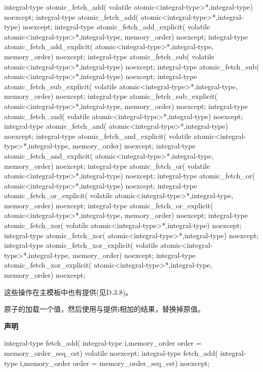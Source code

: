\begin{cpp}
integral-type atomic_fetch_add(
    volatile atomic<integral-type>*,integral-type) noexcept;
integral-type atomic_fetch_add(
    atomic<integral-type>*,integral-type) noexcept;
integral-type atomic_fetch_add_explicit(
    volatile atomic<integral-type>*,integral-type, memory_order) noexcept;
integral-type atomic_fetch_add_explicit(
    atomic<integral-type>*,integral-type, memory_order) noexcept;
integral-type atomic_fetch_sub(
    volatile atomic<integral-type>*,integral-type) noexcept;
integral-type atomic_fetch_sub(
    atomic<integral-type>*,integral-type) noexcept;
integral-type atomic_fetch_sub_explicit(
    volatile atomic<integral-type>*,integral-type, memory_order) noexcept;
integral-type atomic_fetch_sub_explicit(
    atomic<integral-type>*,integral-type, memory_order) noexcept;
integral-type atomic_fetch_and(
    volatile atomic<integral-type>*,integral-type) noexcept;
integral-type atomic_fetch_and(
    atomic<integral-type>*,integral-type) noexcept;
integral-type atomic_fetch_and_explicit(
    volatile atomic<integral-type>*,integral-type, memory_order) noexcept;
integral-type atomic_fetch_and_explicit(
    atomic<integral-type>*,integral-type, memory_order) noexcept;
integral-type atomic_fetch_or(
    volatile atomic<integral-type>*,integral-type) noexcept;
integral-type atomic_fetch_or(
    atomic<integral-type>*,integral-type) noexcept;
integral-type atomic_fetch_or_explicit(
    volatile atomic<integral-type>*,integral-type, memory_order) noexcept;
integral-type atomic_fetch_or_explicit(
    atomic<integral-type>*,integral-type, memory_order) noexcept;
integral-type atomic_fetch_xor(
    volatile atomic<integral-type>*,integral-type) noexcept;
integral-type atomic_fetch_xor(
    atomic<integral-type>*,integral-type) noexcept;
integral-type atomic_fetch_xor_explicit(
    volatile atomic<integral-type>*,integral-type, memory_order) noexcept;
integral-type atomic_fetch_xor_explicit(
    atomic<integral-type>*,integral-type, memory_order) noexcept;
\end{cpp}

这些操作在主模板中也有提供(见D.3.8)。


原子的加载一个值，然后使用与提供i相加的结果，替换掉原值。

\textbf{声明}

\begin{cpp}
integral-type fetch_add(
    integral-type i,memory_order order = memory_order_seq_cst)
    volatile noexcept;
integral-type fetch_add(
    integral-type i,memory_order order = memory_order_seq_cst) noexcept;
\end{cpp}

